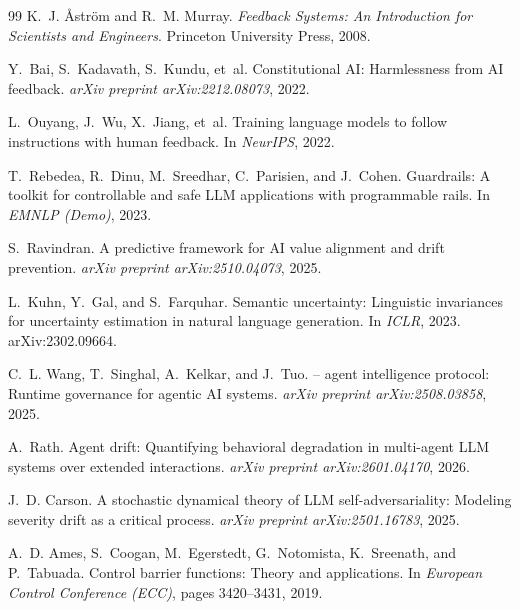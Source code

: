 \documentclass[11pt,twocolumn]{article}
\begin{document}
\begin{thebibliography}{99}
K.~J. \AA{}str\"{o}m and R.~M. Murray.
\newblock \emph{Feedback Systems: An Introduction for Scientists and Engineers}.
\newblock Princeton University Press, 2008.

Y.~Bai, S.~Kadavath, S.~Kundu, et~al.
\newblock Constitutional {AI}: Harmlessness from {AI} feedback.
\newblock \emph{arXiv preprint arXiv:2212.08073}, 2022.

L.~Ouyang, J.~Wu, X.~Jiang, et~al.
\newblock Training language models to follow instructions with human feedback.
\newblock In \emph{NeurIPS}, 2022.

T.~Rebedea, R.~Dinu, M.~Sreedhar, C.~Parisien, and J.~Cohen.
 {G}uardrails: A toolkit for controllable and safe {LLM}
  applications with programmable rails.
\newblock In \emph{EMNLP (Demo)}, 2023.

S.~Ravindran.
\newblock A predictive framework for {AI} value alignment and drift prevention.
\newblock \emph{arXiv preprint arXiv:2510.04073}, 2025.

L.~Kuhn, Y.~Gal, and S.~Farquhar.
\newblock Semantic uncertainty: Linguistic invariances for uncertainty
  estimation in natural language generation.
\newblock In \emph{ICLR}, 2023.
\newblock arXiv:2302.09664.

C.~L. Wang, T.~Singhal, A.~Kelkar, and J.~Tuo.
 -- agent intelligence protocol: Runtime governance for agentic {AI}
  systems.
\newblock \emph{arXiv preprint arXiv:2508.03858}, 2025.

A.~Rath.
\newblock Agent drift: Quantifying behavioral degradation in multi-agent {LLM}
  systems over extended interactions.
\newblock \emph{arXiv preprint arXiv:2601.04170}, 2026.

J.~D. Carson.
\newblock A stochastic dynamical theory of {LLM} self-adversariality: Modeling
  severity drift as a critical process.
\newblock \emph{arXiv preprint arXiv:2501.16783}, 2025.

A.~D. Ames, S.~Coogan, M.~Egerstedt, G.~Notomista, K.~Sreenath, and
  P.~Tabuada.
\newblock Control barrier functions: Theory and applications.
\newblock In \emph{European Control Conference (ECC)}, pages 3420--3431, 2019.


\end{thebibliography}
\end{document}
